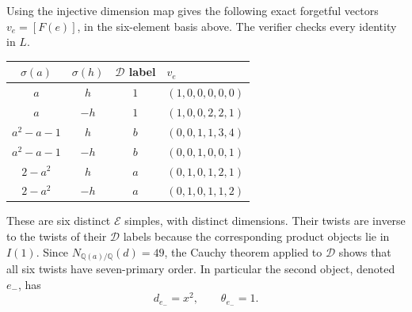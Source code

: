 \documentclass[11pt]{article}
\newcommand{\D}{\mathcal D}
\newcommand{\E}{\mathcal E}
\begin{document}
Using the injective dimension map gives the following exact forgetful
vectors $v_e=[F(e)]$, in the six-element basis above. The verifier checks
every identity in $L$.
\begin{center}
\begin{tabular}{cccl}\toprule
$\sigma(a)$&$\sigma(h)$&$\D$ label&$v_e$\\\midrule
$a$&$h$&$1$&$(1,0,0,0,0,0)$\\
$a$&$-h$&$1$&$(1,0,0,2,2,1)$\\
$a^2-a-1$&$h$&$b$&$(0,0,1,1,3,4)$\\
$a^2-a-1$&$-h$&$b$&$(0,0,1,0,0,1)$\\
$2-a^2$&$h$&$a$&$(0,1,0,1,2,1)$\\
$2-a^2$&$-h$&$a$&$(0,1,0,1,1,2)$\\\bottomrule
\end{tabular}
\end{center}
These are six distinct $\E$ simples, with distinct dimensions. Their twists
are inverse to the twists of their $\D$ labels because the corresponding
product objects lie in $I(1)$. Since $N_{\mathbb Q(a)/\mathbb Q}(d)=49$, the Cauchy theorem
\cite[Theorem 3.9]{BNRW} applied to $\D$ shows that all six twists
have seven-primary order.
In particular the second object, denoted $e_-$, has
\begin{equation}
 d_{e_-}=x^2,\qquad \theta_{e_-}=1.
 \label{eq:eminus}
\end{equation}
\end{document}
